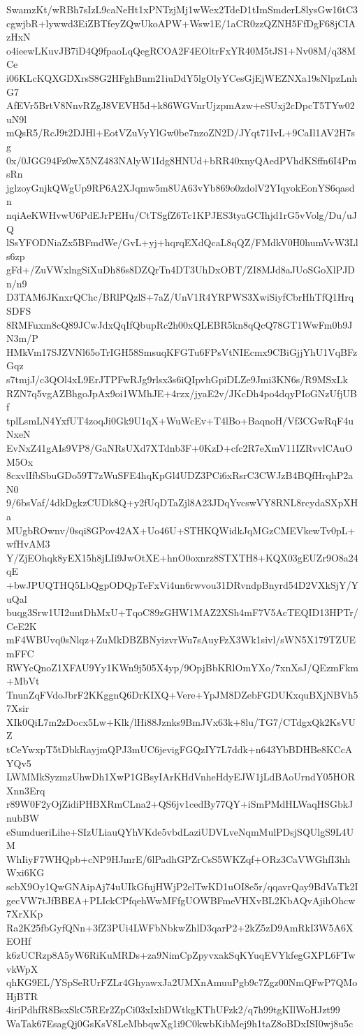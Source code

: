 SwamzKt/wRBh7sIzL9caNeHt1xPNTzjMj1wWex2TdeD1tImSmderL8lysGw16tC3
cgwjbR+lywwd3EiZBTfeyZQwUkoAPW+Wsw1E/1aCR0zzQZNH5FfDgF68jCIAzHxN
o4ieewLKuvJB7iD4Q9fpaoLqQegRCOA2F4EOltrFxYR40M5tJS1+Nv08M/q38MCe
i06KLcKQXGDXrsS8G2HFghBnm21iuDdY5lgOlyYCesGjEjWEZNXa19sNlpzLnhG7
AfEVr5BrtV8NnvRZgJ8VEVH5d+k86WGVnrUjzpmAzw+eSUxj2cDpcT5TYw02uN9l
mQsR5/RcJ9t2DJHl+EotVZuVyYlGw0be7nzoZN2D/JYqt71IvL+9CaIl1AV2H7sg
0x/0JGG94Fz0wX5NZ483NAlyW1Idg8HNUd+bRR40xnyQAedPVhdKSffn6I4PmsRn
jglzoyGnjkQWgUp9RP6A2XJqmw5m8UA63vYb869o0zdolV2YIqyokEonYS6qasdn
nqiAeKWHvwU6PdEJrPEHu/CtTSgfZ6Tc1KPJES3tyaGCIhjd1rG5vVolg/Du/uJQ
lSsYFODNiaZx5BFmdWe/GvL+yj+hqrqEXdQcaL8qQZ/FMdkV0H0humVvW3Lls6zp
gFd+/ZuVWxlngSiXuDh86s8DZQrTn4DT3UhDxOBT/ZI8MJd8aJUoSGoXlPJDn/n9
D3TAM6JKnxrQChc/BRlPQzlS+7aZ/UnV1R4YRPWS3XwiSiyfCbrHhTfQ1HrqSDFS
8RMFuxm8cQ89JCwJdxQqIfQbupRc2h00xQLEBR5kn8qQcQ78GT1WwFm0b9JN3m/P
HMkVm17SJZVNl65oTrIGH58SmsuqKFGTu6FPsVtNIEcmx9CBiGjjYhU1VqBFzGqz
s7tmjJ/c3QOl4xL9ErJTPFwRJg9rlsx3s6iQIpvhGpiDLZe9Jmi3KN6s/R9MSxLk
RZN7q5vgAZBhgoJpAx9oi1WMhJE+4rzx/jyaE2v/JKcDh4po4dqyPIoGNzUfjUBf
tplLsmLN4YxfUT4zoqJi0Gk9U1qX+WuWcEv+T4lBo+BaqnoH/Vf3CGwRqF4uNxeN
EvNxZ41gAIs9VP8/GaNRsUXd7XTdnb3F+0KzD+cfc2R7eXmV11IZRvvlCAuOM5Ox
8cxvlIfbSbuGDo59T7zWuSFE4hqKpGl4UDZ3PCi6xRsrC3CWJzB4BQfHrqhP2aN0
9/6bsVaf/4dkDgkzCUDk8Q+y2fUqDTaZjl8A23JDqYvcswVY8RNL8rcydaSXpXHa
MUgbROwnv/0sqi8GPov42AX+Uo46U+STHKQWidkJqMGzCMEVkewTv0pL+wfHvAM3
Y/ZjEOhqk8yEX15h8jLIi9JwOtXE+hnO0oxnrz8STXTH8+KQX03gEUZr9O8a24qE
+bwJPUQTHQ5LbQgpODQpTeFxVi4un6rwvou31DRvndpBnyrd54D2VXkSjY/YuQal
buqg3Srw1UI2untDhMxU+TqoC89zGHW1MAZ2XSh4mF7V5AcTEQID13HPTr/CeE2K
mF4WBUvq0sNlqz+ZuMkDBZBNyizvrWu7sAuyFzX3Wk1sivl/sWN5X179TZUEmFFC
RWYcQnoZ1XFAU9Yy1KWn9j505X4yp/9OpjBbKRlOmYXo/7xnXsJ/QEzmFkm+MbVt
TnunZqFVdoJbrF2KKggnQ6DrKIXQ+Vere+YpJM8DZebFGDUKxquBXjNBVh57Xsir
XIk0QiL7m2zDocx5Lw+Klk/lHi88Jznks9BmJVx63k+8lu/TG7/CTdgxQk2KsVUZ
tCeYwxpT5tDbkRayjmQPJ3mUC6jevigFGQzIY7L7ddk+n643YbBDHBe8KCcAYQv5
LWMMkSyzmzUhwDh1XwP1GBsyIArKHdVnheHdyEJW1jLdBAoUrndY05HORXnn3Erq
r89W0F2yOjZidiPHBXRmCLna2+QS6jv1cedBy77QY+iSmPMdHLWaqHSGbkJnubBW
eSumdueriLihe+SIzULiauQYhVKde5vbdLaziUDVLveNqmMulPDsjSQUlgS9L4UM
WhIiyF7WHQpb+cNP9HJmrE/6lPadhGPZrCsS5WKZqf+ORz3CaVWGhfI3hhWxi6KG
scbX9Oy1QwGNAipAj74uUIkGfujHWjP2elTwKD1uOI8e5r/qqavrQay9BdVaTk2I
gecVW7tJfBBEA+PLIckCPfqehWwMFfgUOWBFmeVHXvBL2KbAQvAjihOhcw7XrXKp
Ra2K25fbGyfQNn+3fZ3PUi4LWFbNbkwZhlD3qarP2+2kZ5zD9AmRkI3W5A6XEOHf
k6zUCRzp8A5yW6RiKuMRDs+za9NimCpZpyvxakSqKYuqEVYkfegGXPL6FTwvkWpX
qhKG9EL/YSpSeRUrFZLr4GhyawxJa2UMXnAmuuPgb9c7Zgz00NmQFwP7QMoHjBTR
4iriPdhfR8BsxSkC5REr2ZpCi03xIxliDWtkgKThUFzk2/q7h99tgKIlWoHJzt99
WaTak67EsagQj0GsKsV8LeMbbqwXg1i9C0kwbKibMej9h1taZ8oBDxISI0wj8u5c
